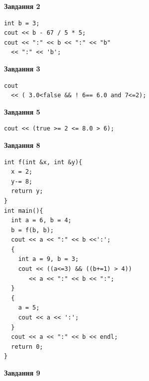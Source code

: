 \documentclass[12pt, ukrainian]{article}
\begin{document}
{\begin {large}
\begin{minipage}[t]{7.0cm}
\end{minipage}
\vline \hspace{1mm}
\begin{minipage}[t]{11.0cm}

\begin{center}
\textbf{Завдання 2}
\end{center}
\vspace{-8mm}

\begin{verbatim}
int b = 3;
cout << b - 67 / 5 * 5;
cout << ":" << b << ":" << "b" 
  << ":" << 'b';
\end{verbatim}



\begin{center}
\textbf{Завдання 3}
\end{center}
\vspace{-8mm}

\begin{verbatim}
cout 
  << ( 3.0<false && ! 6== 6.0 and 7<=2);
\end{verbatim}



\begin{center}
\textbf{Завдання 5}
\end{center}
\vspace{-8mm}

\begin{verbatim}
cout << (true >= 2 <= 8.0 > 6);
\end{verbatim}



\begin{center}
\textbf{Завдання 8}
\end{center}
\vspace{-8mm}

\begin{verbatim}
int f(int &x, int &y){
  x = 2;
  y-= 8;
  return y;
}
int main(){
  int a = 6, b = 4;
  b = f(b, b);
  cout << a << ":" << b <<':';
  {
    int a = 9, b = 3;
    cout << ((a<=3) && ((b+=1) > 4))
       << a << ":" << b << ":";
  }
  {
    a = 5;
    cout << a << ':';
  }
  cout << a << ":" << b << endl;
  return 0;
}
\end{verbatim}

\end{minipage}


\begin{minipage}[t]{7.0cm}

\begin{center}
\textbf{Завдання 9}
\end{center}
\vspace{-8mm}


\end{minipage}
\end{large}}
\end{document}
